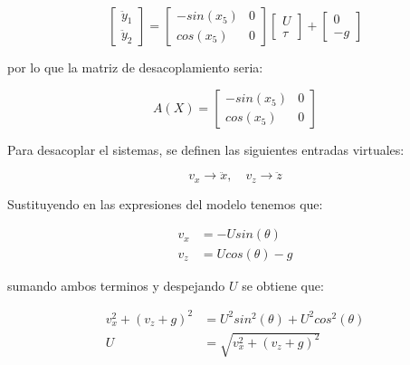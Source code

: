 \begin{equation*}
    \begin{bmatrix}
        \ddot{y}_1\\\ddot{y}_2
    \end{bmatrix}=\begin{bmatrix}
        -sin(x_5) & 0\\cos(x_5) & 0
    \end{bmatrix}\begin{bmatrix}
        U\\\tau
    \end{bmatrix}+\begin{bmatrix}
        0\\-g
    \end{bmatrix}
\end{equation*}

por lo que la matriz de desacoplamiento seria:

\begin{equation*}
    A(X)=\begin{bmatrix}
        -sin(x_5) & 0\\cos(x_5) & 0
    \end{bmatrix}
\end{equation*}

Para desacoplar el sistemas, se definen las siguientes entradas virtuales:

\begin{equation*}
    v_x\to \ddot{x}, \quad v_z\to \ddot{z}
\end{equation*}

Sustituyendo en las expresiones del modelo tenemos que:

\begin{equation*}
    \begin{aligned}
        v_x&=-U sin(\theta)\\
        v_z&=U cos(\theta)-g
    \end{aligned}
\end{equation*}

sumando ambos terminos y despejando \(U\) se obtiene que:

\begin{equation*}
    \begin{aligned}
        v_x^2+(v_z+g)^2&=U^2 sin^2(\theta)+U^2 cos^2(\theta)\\
        U&=\sqrt{v_x^2+(v_z+g)^2}\\
    \end{aligned}
\end{equation*}

